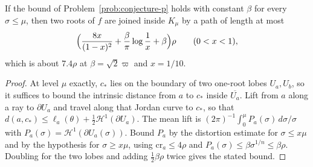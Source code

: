 \begin{theorem}
\label{res:conjecture-p-consumer}
If the bound of Problem~\ref{prob:conjecture-p} holds with constant $\beta$
for every $\sigma\le\mu$, then two roots of $f$ are joined inside $K_\mu$
by a path of length at most
\[
 \Bigl(\frac{8x}{(1-x)^2}+\frac\beta\pi\log\frac1x+\beta\Bigr)\rho
 \qquad(0<x<1),
\]
which is about $7.4\rho$ at $\beta=\sqrt2\varpi$ and $x=1/10$.
\end{theorem}

\begin{proof}
At level $\mu$ exactly, $c_*$ lies on the boundary of two one-root lobes
$U_a,U_b$, so it suffices to bound the intrinsic distance from $a$ to $c_*$
inside $\overline{U_a}$.  Lift from $a$ along a ray to $\partial U_a$ and
travel along that Jordan curve to $c_*$, so that
$d(a,c_*)\le\ell_a(\theta)+\tfrac12\mathcal H^1(\partial U_a)$.  The mean lift
is $(2\pi)^{-1}\int_0^\mu P_a(\sigma)\,d\sigma/\sigma$ with
$P_a(\sigma)=\mathcal H^1(\partial U_a(\sigma))$.  Bound $P_a$ by the
distortion estimate for $\sigma\le x\mu$ and by the hypothesis for
$\sigma\ge x\mu$, using $\mathrm{cr}_a\le4\rho$ and
$P_a(\sigma)\le\beta\sigma^{1/n}\le\beta\rho$.  Doubling for the two lobes and
adding $\tfrac12\beta\rho$ twice gives the stated bound.
\end{proof}

